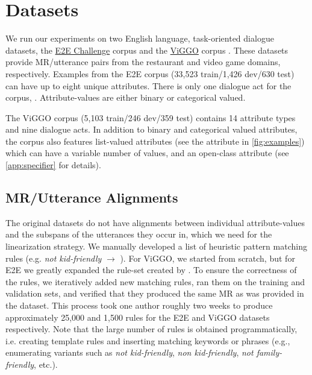 \section{Datasets}

We run our experiments on two English language, task-oriented dialogue
datasets, the \href{http://www.macs.hw.ac.uk/InteractionLab/E2E/}{E2E
Challenge} corpus \cite{novikova2017} and the
\href{https://nlds.soe.ucsc.edu/viggo}{ViGGO} corpus \cite{juraska2019}. These
datasets provide MR/utterance pairs from the restaurant and video game
domains, respectively. Examples from the E2E corpus (33,523 train/1,426
dev/630 test) can have up to eight unique attributes.  There is only one
dialogue act for the corpus, .  Attribute-values are either binary
or categorical valued.

The ViGGO corpus (5,103 train/246 dev/359 test) contains 14 attribute types
and nine dialogue acts. %
In
addition to binary and categorical valued attributes, the corpus also features
list-valued attributes (see the  attribute in
\autoref{fig:examples}) which can have a variable number of values, and an
open-class  attribute (see \autoref{app:specifier} for details). 

\subsection{MR/Utterance Alignments} \label{sec:align}

The original datasets do not have alignments between individual
attribute-values and the subspans of the utterances they occur in, which we
need for the  linearization strategy.  We manually developed a
list of heuristic pattern matching rules (e.g. \textit{not kid-friendly}
$\rightarrow$ ).  For ViGGO, we started from scratch,
but for E2E we greatly expanded the rule-set created by \citet{dusek2019}.  To
ensure the correctness of the rules, we iteratively added new matching rules,
ran them on the training and validation sets, and verified that they produced
the same MR as was provided in the dataset. This process took one author
roughly two weeks to produce approximately 25,000 and 1,500 rules for the E2E
and ViGGO datasets respectively. Note that the large number of rules is
obtained programmatically, i.e. creating template rules and inserting matching
keywords or phrases (e.g., enumerating variants such as \textit{not
kid-friendly}, \textit{non kid-friendly}, \textit{not family-friendly}, etc.).

